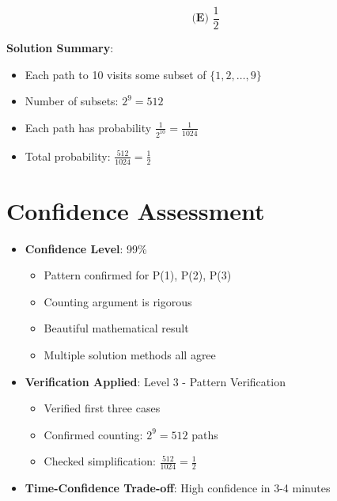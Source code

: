 \documentclass[11pt]{article}
\begin{document}
\[\boxed{\textbf{(E) } \frac{1}{2}}\]

\textbf{Solution Summary}:
\begin{itemize}
    \item Each path to 10 visits some subset of $\{1,2,\ldots,9\}$
    \item Number of subsets: $2^9 = 512$
    \item Each path has probability $\frac{1}{2^{10}} = \frac{1}{1024}$
    \item Total probability: $\frac{512}{1024} = \frac{1}{2}$
\end{itemize}

\section*{Confidence Assessment}
\begin{itemize}[leftmargin=*]
    \item \textbf{Confidence Level}: 99\%
    \begin{itemize}
        \item Pattern confirmed for P(1), P(2), P(3)
        \item Counting argument is rigorous
        \item Beautiful mathematical result
        \item Multiple solution methods all agree
    \end{itemize}
    \item \textbf{Verification Applied}: Level 3 - Pattern Verification
    \begin{itemize}
        \item Verified first three cases
        \item Confirmed counting: $2^9 = 512$ paths
        \item Checked simplification: $\frac{512}{1024} = \frac{1}{2}$
    \end{itemize}
    \item \textbf{Time-Confidence Trade-off}: High confidence in 3-4 minutes
\end{itemize}
\end{document}
